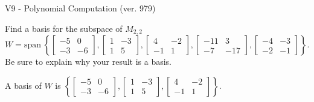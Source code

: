 \begin{exercise}
  \begin{exerciseTitle}V9 - Polynomial Computation (ver. 979)\end{exerciseTitle}
  \begin{exerciseStatement}
    Find a basis for the subspace of \(M_{2,2}\) 
\[W=\mathrm{span}\ \left\{\left[\begin{array}{cc}
-5 & 0 \\
-3 & -6
\end{array}\right] , \left[\begin{array}{cc}
1 & -3 \\
1 & 5
\end{array}\right] , \left[\begin{array}{cc}
4 & -2 \\
-1 & 1
\end{array}\right] , \left[\begin{array}{cc}
-11 & 3 \\
-7 & -17
\end{array}\right] , \left[\begin{array}{cc}
-4 & -3 \\
-2 & -1
\end{array}\right]\right\}.\]
 Be sure to explain why your result is a basis.


  \end{exerciseStatement}
  \begin{exerciseAnswer}
   A basis of \(W\) is  \(\left\{\left[\begin{array}{cc}
-5 & 0 \\
-3 & -6
\end{array}\right] , \left[\begin{array}{cc}
1 & -3 \\
1 & 5
\end{array}\right] , \left[\begin{array}{cc}
4 & -2 \\
-1 & 1
\end{array}\right]\right\}\).
  


  \end{exerciseAnswer}
\end{exercise}